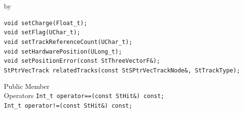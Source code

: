 \documentclass[twoside]{article}
\newcommand{\entrylabel}[1]{\mbox{\textbf{{#1}}}\hfil}%
\newenvironment{entry}
{\begin{list}{}%
    {\renewcommand{\makelabel}{\entrylabel}%
     \setlength{\labelwidth}{90pt}%
     \setlength{\leftmargin}{\labelwidth}
     \advance\leftmargin by \labelsep%
      }%
    }%
  {\end{list}}
\newcommand{\Entrylabel}[1]%
{\raisebox{0pt}[1ex][0pt]{\makebox[\labelwidth][l]%
    {\parbox[t]{\labelwidth}{\hspace{0pt}\textbf{{#1}}}}}}
\newenvironment{Entry}%
{\renewcommand{\entrylabel}{\Entrylabel}\begin{entry}}%
  {\end{entry}}
\begin{document}
\begin{Entry}
    \verb+void setCharge(Float_t);+\\
    \verb+void setFlag(UChar_t);+\\
    \verb+void setTrackReferenceCount(UChar_t);+\\
    \verb+void setHardwarePosition(ULong_t);+\\
    \verb+void setPositionError(const StThreeVectorF&);+\\
    \verb+StPtrVecTrack relatedTracks(const StSPtrVecTrackNode&, StTrackType);+\\
    
\item[Public Member\\ Operators]
    \verb+Int_t operator==(const StHit&) const;+\\
    \verb+Int_t operator!=(const StHit&) const;+\\
\end{Entry}
\clearpage
\end{document}
